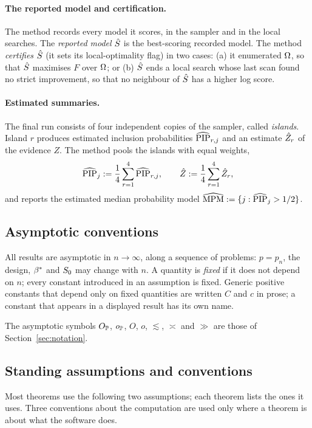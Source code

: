 \paragraph{The reported model and certification.} The method records every model it scores, in the sampler and in the
local searches. The \emph{reported model} $\hat S$ is the best-scoring recorded model. The method \emph{certifies}
$\hat S$ (it sets its local-optimality flag) in two cases: (a) it enumerated $\Omega$, so that $\hat S$ maximises $F$ over
$\Omega$; or (b) $\hat S$ ends a local search whose last scan found no strict improvement, so that no neighbour of $\hat S$
has a higher log score.

\paragraph{Estimated summaries.} The final run consists of four independent copies of the sampler, called
\emph{islands}. Island $r$ produces
estimated inclusion probabilities $\widehat{\mathrm{PIP}}_{r,j}$ and an estimate $\hat Z_r$ of the evidence $Z$. The method pools the
islands with equal weights,
\[
  \widehat{\mathrm{PIP}}_j:=\frac14\sum_{r=1}^4\widehat{\mathrm{PIP}}_{r,j},\qquad \hat Z:=\frac14\sum_{r=1}^4\hat Z_r,
\]
and reports the estimated median probability model $\widehat{\mathrm{MPM}}:=\{j:\widehat{\mathrm{PIP}}_j>1/2\}$.

\subsection{Asymptotic conventions}\label{sec:asymptotics}

All results are asymptotic in $n\to\infty$, along a sequence of problems: $p=p_n$, the design, $\beta^*$ and $S_0$ may
change with $n$. A quantity is \emph{fixed} if it does not depend on $n$; every constant introduced in an assumption is
fixed. Generic positive constants that depend only on fixed quantities are written $C$ and $c$ in prose; a constant that
appears in a displayed result has its own name.

The asymptotic symbols $O_{\mathbb{P}}$, $o_{\mathbb{P}}$, $O$, $o$, $\lesssim$, $\asymp$ and $\gg$ are those of Section~\ref{sec:notation}.

\subsection{Standing assumptions and conventions}\label{sec:standing}

Most theorems use the following two assumptions; each theorem lists the ones it uses. Three conventions about the
computation are used only where a theorem is about what the software does.


